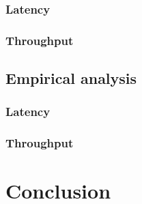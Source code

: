 \documentclass[a4paper]{article}
\begin{document}
        \subsubsection*{Latency}

        \subsubsection*{Throughput}

        \subsection{Empirical analysis}

        \subsubsection*{Latency}

        \subsubsection*{Throughput}

        \section*{Conclusion}

        
\end{document}
